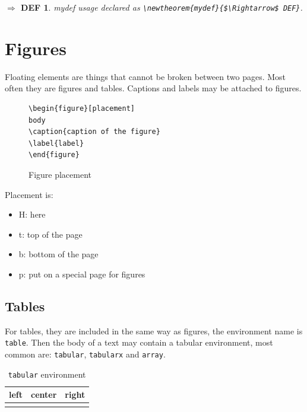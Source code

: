 \newtheorem{mydef}{$\Rightarrow$ DEF}
\begin{mydef}
mydef usage declared as \lstinline!\newtheorem{mydef}{$\Rightarrow$ DEF}!.
\end{mydef}

\section{Figures}

Floating elements are things that cannot be broken between two pages.
Most often they are figures and tables.
Captions and labels may be attached to figures.

\begin{figure}[H]
\centering
\begin{lstlisting}
\begin{figure}[placement]
body
\caption{caption of the figure}
\label{label}
\end{figure}
\end{lstlisting}
\caption{Figure placement}
\label{fig:figure-placement}
\end{figure}

Placement is:
\begin{itemize}
\item H: here
\item t: top of the page
\item b: bottom of the page
\item p: put on a special page for figures
\end{itemize}

\subsection{Tables}

For tables, they are included in the same way as figures, the environment name
is \texttt{table}.
Then the body of a text may contain a tabular environment, most common are:
\texttt{tabular}, \texttt{tabularx} and \texttt{array}.

\begin{table}[H]
\centering
\begin{tabular}{l|c|r}
\hline\hline
left & center & right \\
\hline
\hspace{2cm} & \hspace{2cm} & \hspace{2cm} \\
\end{tabular}
\caption{\texttt{tabular} environment}
\end{table}

